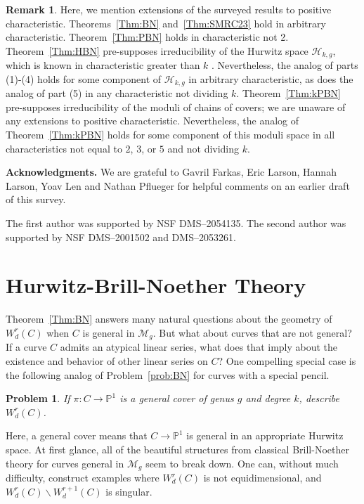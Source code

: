 \documentclass{amsart}
\newtheorem{problem}[theorem]{Problem}
\theoremstyle{definition}
\newtheorem{remark}[theorem]{Remark}
\newcommand{\PP}{\mathbb{P}}
\begin{document}
\begin{remark} \label{rem:characteristic}
Here, we mention extensions of the surveyed results to positive characteristic. Theorems~\ref{Thm:BN} and~\ref{Thm:SMRC23} hold in arbitrary characteristic.  Theorem~\ref{Thm:PBN} holds in characteristic not 2.  Theorem~\ref{Thm:HBN} pre-supposes irreducibility of the Hurwitz space $\mathcal{H}_{k,g}$, which is known in characteristic greater than $k$ \cite{Fulton69}.  Nevertheless, the analog of parts (1)-(4) holds for some component of $\mathcal{H}_{k,g}$ in arbitrary characteristic, as does the analog of part (5) in any characteristic not dividing $k$.  Theorem~\ref{Thm:kPBN} pre-supposes irreducibility of the moduli of chains of covers; we are unaware of any extensions to positive characteristic.  Nevertheless, the analog of Theorem~\ref{Thm:kPBN} holds for some component of this moduli space in all characteristics not equal to $2$, $3$, or $5$ and not dividing $k$.  
\end{remark}

\noindent \textbf{Acknowledgments.} We are grateful to Gavril Farkas, Eric Larson, Hannah Larson, Yoav Len and Nathan Pflueger for helpful comments on an earlier draft of this survey.

The first author was supported by NSF DMS--2054135. The second author was supported by NSF DMS--2001502 and DMS--2053261.



\section{Hurwitz-Brill-Noether Theory}
\label{Sec:Hurwitz}

Theorem~\ref{Thm:BN} answers many natural questions about the geometry of $W^r_d(C)$ when $C$ is general in $\mathcal{M}_g$. But what about curves that are not general?  If a curve $C$ admits an atypical linear series, what does that imply about the existence and behavior of other linear series on $C$?  One compelling special case is the following analog of Problem~\ref{prob:BN} for curves with a special pencil.


\begin{problem}
\label{Prob:HBN}
If $\pi \colon C \to \PP^1$ is a general cover of genus $g$ and degree $k$, describe $W^r_d (C)$.
\end{problem}

\noindent Here, a general cover means that $C \to \PP^1$ is general in an appropriate Hurwitz space.  At first glance, all of the beautiful structures from classical Brill-Noether theory for curves general in $\mathcal{M}_g$ seem to break down.  One can, without much difficulty, construct examples where $W^r_d (C)$ is not equidimensional, and $W^r_d (C) \smallsetminus W^{r+1}_d(C)$ is singular.
\end{document}
